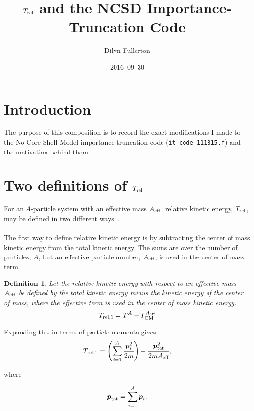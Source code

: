 \documentclass{article}
\def\aeff{A_{\rm{eff}}}
\def\trel{T_{\rm{rel}}}
\def\treli_#1{T_{\rm{rel},#1}}
\def\momvect{\boldsymbol{p}}
\newtheorem{definition}{Definition}[section]
\begin{document}
\title{$T_{\rm{rel}}$ and the NCSD Importance-Truncation Code}
\author{Dilyn Fullerton}
\date{2016--09--30}
\maketitle

\tableofcontents

\section{Introduction}
The purpose of this composition is to record the exact modifications
I made to the No-Core Shell Model importance truncation code
(\texttt{it-code-111815.f}) and the motivation behind them.

\section{Two definitions of $\trel$}
For an $A$-particle system with an effective mass $\aeff$,
relative kinetic energy, $\trel$, may be defined in two different
ways~\cite{treldefs}.
\\\\
The first way to define relative kinetic energy is by subtracting
the center of mass kinetic energy from the total kinetic energy.
The sums are over the number of particles, $A$, but an effective
particle number, $\aeff$, is used in the center of mass term.

\begin{definition}\label{def:trel1}
  Let the relative kinetic energy with respect to an effective mass $\aeff$
  be defined by the total kinetic energy minus the kinetic energy of
  the center of mass, where the effective term is used in the center of
  mass kinetic energy.
  \begin{equation*}
    \treli_1 = T^A - T_{\rm{CM}}^{\aeff}
  \end{equation*}
\end{definition}

Expanding this in terms of particle momenta gives
\begin{equation*}
  \treli_1 =
  \left(\displaystyle\sum_{i=1}^A \cfrac{\momvect_i^2}{2m}\right)
  - \cfrac{\momvect_{\rm{tot}}^2}{2m\aeff},
\end{equation*}

where

\begin{equation*}
  \momvect_{\rm{tot}} = \displaystyle\sum_{i=1}^A \momvect_i.
\end{equation*}
\end{document}
